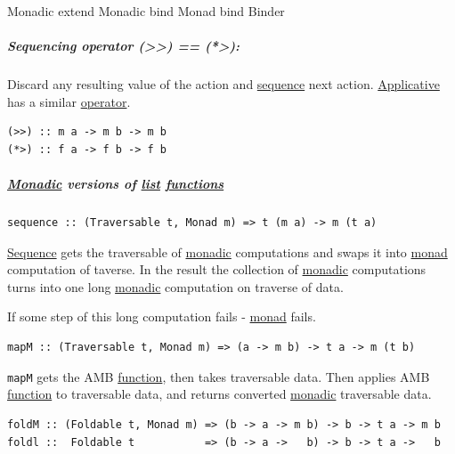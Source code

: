 \documentclass[a4paper,14pt,oneside]{book}
\begin{document}
\label{org1d70c5f}Monadic extend
\label{org8285ec9}Monadic bind
\label{org31b25ca}Monad bind
\label{org4c65094}Binder

\subsubsubparagraph{(>>=)}
\label{sec:org5bc2c21}

\subsubsubparagraph{>>=}
\label{sec:orgf01adab}

\subsubsubparagraph{(=<<)}
\label{sec:orga02ce6f}

\subsubsubparagraph{=<<}
\label{sec:org707dec5}

\subparagraph{\label{org4f98b40}Sequencing operator (>>) == (*>):}
\label{sec:orge7b2181}
Discard any resulting value of the action and \hyperref[orgcaf3223]{sequence} next action.
\hyperref[org598aca6]{Applicative} has a similar \hyperref[org45c9882]{operator}.
\begin{verbatim}
(>>) :: m a -> m b -> m b
(*>) :: f a -> f b -> f b
\end{verbatim}

\subparagraph{\hyperref[org24cb0e3]{Monadic} versions of \hyperref[orgab36b30]{list} \hyperref[org934327c]{functions}}
\label{sec:orgb31d135}
\begin{verbatim}
sequence :: (Traversable t, Monad m) => t (m a) -> m (t a)
\end{verbatim}

\hyperref[orgcaf3223]{Sequence} gets the traversable of \hyperref[org24cb0e3]{monadic} computations and swaps it into \hyperref[orged38b8b]{monad} computation of taverse. In the result the collection of \hyperref[org24cb0e3]{monadic} computations turns into one long \hyperref[org24cb0e3]{monadic} computation on traverse of data.

If some step of this long computation fails - \hyperref[orged38b8b]{monad} fails.

\begin{verbatim}
mapM :: (Traversable t, Monad m) => (a -> m b) -> t a -> m (t b)
\end{verbatim}

\texttt{mapM} gets the AMB \hyperref[org679af45]{function}, then takes traversable data. Then applies AMB \hyperref[org679af45]{function} to traversable data, and returns converted \hyperref[org24cb0e3]{monadic} traversable data.

\begin{verbatim}
foldM :: (Foldable t, Monad m) => (b -> a -> m b) -> b -> t a -> m b
foldl ::  Foldable t           => (b -> a ->   b) -> b -> t a ->   b
\end{verbatim}
\end{document}
